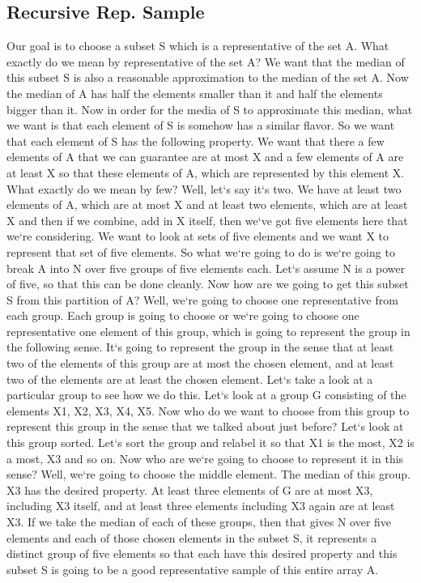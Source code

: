 \subsection{Recursive Rep.
Sample}
Our goal is to choose a subset S which is a representative of the set A\@.
What exactly do we mean by representative of the set A? We want that the median of this subset S is also a reasonable approximation to the median of the set A\@.
Now the median of A has half the elements smaller than it and half the elements bigger than it.
Now in order for the media of S to approximate this median, what we want is that each element of S is somehow has a similar flavor.
So we want that each element of S has the following property.
We want that there a few elements of A that we can guarantee are at most X and a few elements of A are at least X so that these elements of A, which are represented by this element X\@.
What exactly do we mean by few? Well, let`s say it`s two.
We have at least two elements of A, which are at most X and at least two elements, which are at least X and then if we combine, add in X itself, then we`ve got five elements here that we`re considering.
We want to look at sets of five elements and we want X to represent that set of five elements.
So what we`re going to do is we`re going to break A into N over five groups of five elements each.
Let`s assume N is a power of five, so that this can be done cleanly.
Now how are we going to get this subset S from this partition of A? Well, we`re going to choose one representative from each group.
Each group is going to choose or we`re going to choose one representative one element of this group, which is going to represent the group in the following sense.
It`s going to represent the group in the sense that at least two of the elements of this group are at most the chosen element, and at least two of the elements are at least the chosen element.
Let`s take a look at a particular group to see how we do this.
Let`s look at a group G consisting of the elements X1, X2, X3, X4, X5.
Now who do we want to choose from this group to represent this group in the sense that we talked about just before? Let`s look at this group sorted.
Let`s sort the group and relabel it so that X1 is the most, X2 is a most, X3 and so on.
Now who are we`re going to choose to represent it in this sense? Well, we`re going to choose the middle element.
The median of this group.
X3 has the desired property.
At least three elements of G are at most X3, including X3 itself, and at least three elements including X3 again are at least X3.
If we take the median of each of these groups, then that gives N over five elements and each of those chosen elements in the subset S, it represents a distinct group of five elements so that each have this desired property and this subset S is going to be a good representative sample of this entire array A\@.
